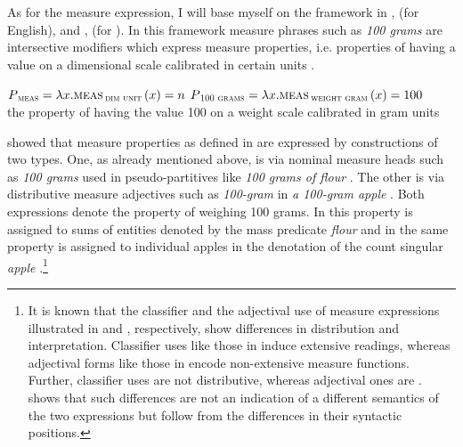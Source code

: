 \documentclass[output=paper]{langscibook}
\begin{document}
\begin{sloppypar}
As for the measure expression, I will base myself on the framework in \citet{Landman2004,Landman2016}, \citet{Rothstein2009,Rothstein2011,Rothstein2017} (for English), and \citet{Partee.Borschev2012}, \citet{Khrizman2016,Khrizman2016b} (for ). In this framework measure phrases such as \textit{100 grams} are intersective modifiers which express measure properties, i.e. properties of having a value on a dimensional scale calibrated in certain units .
\end{sloppypar}

\ea\label{ex:khrizmann:14}
    \ea\label{ex:khrizmann:14a} $P\textsubscript{\textsc{meas}} = \lambda x. \textsc{meas}\,\textsubscript{\textsc{dim unit}}\,(x) = n$
    \ex\label{ex:khrizmann:14b} $P\textsubscript{\textsc{100 grams}} = \lambda x. \textsc{meas}\,\textsubscript{\textsc{weight gram}}\,(x) = 100$\\
    {the property of having the value 100 on a weight scale calibrated in gram units}
    \z
\z

\noindent \citet{Rothstein2017} showed that measure properties as defined in  are expressed by constructions of two types. One, as already mentioned above, is via nominal measure heads such as \textit{100 grams} used in pseudo-partitives like \textit{100 grams of flour} . The other is via distributive measure adjectives such as \textit{100-gram} in \textit{a 100-gram apple} . Both expressions denote the property of weighing 100 grams. In  this property is assigned to sums of entities denoted by the mass predicate \textit{flour}  and in  the same property is assigned to individual apples in the denotation of the count singular \textit{apple} .\footnote{It is known that the classifier and the adjectival use of measure expressions illustrated in  and , respectively, show differences in distribution and interpretation. Classifier uses like those in  induce extensive readings, whereas adjectival forms like those in  encode non-extensive measure functions. Further, classifier uses are not distributive, whereas adjectival ones are \citep{Schwarzschild2005}. \citet{Rothstein2017} shows that such differences are not an indication of a different semantics of the two expressions but follow from the differences in their syntactic positions.}
\end{document}
